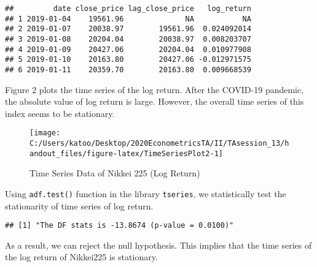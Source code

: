 \documentclass[
  12pt,
]{article}
\newenvironment{Shaded}{\begin{snugshade}}{\end{snugshade}}
\newcommand{\DataTypeTok}[1]{\textcolor[rgb]{0.13,0.29,0.53}{#1}}
\newcommand{\DecValTok}[1]{\textcolor[rgb]{0.00,0.00,0.81}{#1}}
\newcommand{\KeywordTok}[1]{\textcolor[rgb]{0.13,0.29,0.53}{\textbf{#1}}}
\newcommand{\NormalTok}[1]{#1}
\newcommand{\OperatorTok}[1]{\textcolor[rgb]{0.81,0.36,0.00}{\textbf{#1}}}
\newcommand{\StringTok}[1]{\textcolor[rgb]{0.31,0.60,0.02}{#1}}
\begin{document}
\begin{verbatim}
##         date close_price lag_close_price   log_return
## 1 2019-01-04    19561.96              NA           NA
## 2 2019-01-07    20038.97        19561.96  0.024092014
## 3 2019-01-08    20204.04        20038.97  0.008203707
## 4 2019-01-09    20427.06        20204.04  0.010977908
## 5 2019-01-10    20163.80        20427.06 -0.012971575
## 6 2019-01-11    20359.70        20163.80  0.009668539
\end{verbatim}

Figure 2 plots the time series of the log return. After the COVID-19
pandemic, the absolute value of log return is large. However, the
overall time series of this index seems to be stationary.

\begin{figure}[h]

{\centering \texttt{[image: C:/Users/katoo/Desktop/2020EconometricsTA/II/TAsession\_13/handout\_files/figure-latex/TimeSeriesPlot2-1]} 

}

\caption{Time Series Data of Nikkei 225 (Log Return)}\label{fig:TimeSeriesPlot2}
\end{figure}

Using \texttt{adf.test()} function in the library \texttt{tseries}, we
statistically test the stationarity of time series of log return.

\begin{Shaded}
\end{Shaded}

\begin{verbatim}
## [1] "The DF stats is -13.8674 (p-value = 0.0100)"
\end{verbatim}

As a result, we can reject the null hypothesis. This implies that the
time series of the log return of Nikkei225 is stationary.
\end{document}

